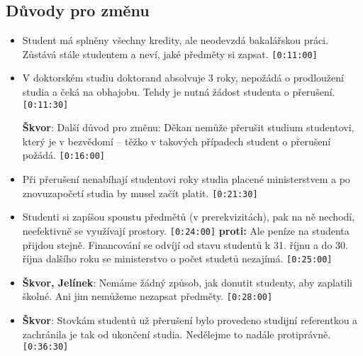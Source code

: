 \documentclass[a4paper,10pt,notitlepage]{article}
\newcommand{\ts}[1]{\texttt{[#1]}}
\newcommand{\cl}[1]{\noindent \textbf{#1}:}
\begin{document}
\subsection{Důvody pro změnu}
\begin{itemize}
\item Student má splněny všechny kredity, ale neodevzdá bakalářskou práci. Zůstává stále studentem a neví, jaké předměty si zapsat. \ts{0:11:00}

\item V doktorském studiu doktorand absolvuje 3 roky, nepožádá o prodloužení studia a čeká na obhajobu. Tehdy je nutná žádost studenta o přerušení. \ts{0:11:30}

\cl{Škvor} Další důvod pro změnu: Děkan nemůže přerušit studium studentovi, který je v bezvědomí -- těžko v takových případech student o přerušení požádá. \ts{0:16:00}

\item Při přerušení nenabíhají studentovi roky studia placené ministerstvem a po znovuzapočetí studia by musel začít platit. \ts{0:21:30}

\item Studenti si zapíšou spoustu předmětů (v prerekvizitách), pak na ně nechodí, neefektivně se využívají prostory.  \ts{0:24:00} \textbf{proti:} Ale peníze na studenta přijdou stejně. Financování se odvíjí od stavu studentů k 31. říjnu a do 30. října dalšího roku se ministerstvo o počet studetů nezajímá. \ts{0:25:00}

\item \cl{Škvor, Jelínek} Nemáme žádný způsob, jak donutit studenty, aby zaplatili školné. Ani jim nemůžeme nezapsat předměty. \ts{0:28:00}

\item \cl{Škvor} Stovkám studentů už přerušení bylo provedeno studijní referentkou a zachránila je tak od ukončení studia. Nedělejme to nadále protiprávně. \ts{0:36:30} 

\end{itemize}
\end{document}
